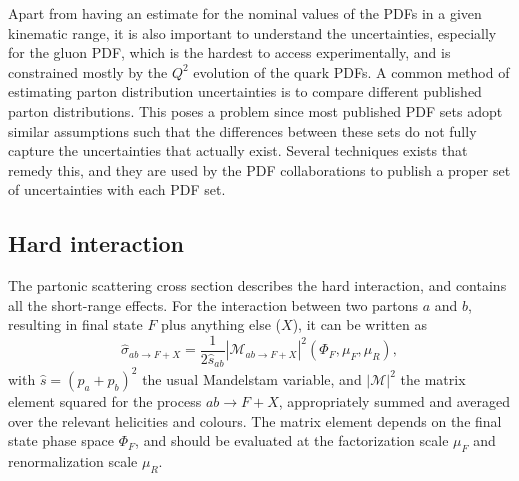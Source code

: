 Apart from having an estimate for the nominal values of the PDFs in a given kinematic range, it is
also important to understand the uncertainties, especially for the gluon PDF, which is the hardest
to access experimentally, and is constrained mostly by the $Q^2$ evolution of the quark PDFs. 
A common method of estimating parton distribution uncertainties is to compare different published
parton distributions. This poses a problem since most published PDF sets adopt similar
assumptions such that the differences between these sets do not fully capture the uncertainties that
actually exist. Several techniques exists that remedy this, and they are used by the PDF
collaborations to publish a proper set of uncertainties with each PDF set.  



\subsection{Hard interaction \label{sec:event_hard_interaction}}



The partonic scattering cross section describes the hard interaction, and contains all the
short-range effects. For the interaction between two partons $a$ and $b$, resulting in final state
$F$ plus anything else ($X$), it can be written as
\begin{equation}
  \hat{\sigma}_{ab\rightarrow F+X} = \frac{1}{2\hat{s}_{ab}} | \mathcal{M}_{ab\rightarrow
F+X}|^2(\Phi_F, \mu_F, \mu_R), 
\end{equation}
with $\hat{s} = (p_a + p_b)^2$ the usual Mandelstam variable, and 
$|\mathcal{M}|^2$ the matrix element squared for the process $a b \rightarrow F+X$, appropriately
summed and averaged over the relevant helicities and colours. 
The matrix element depends on the final state phase space $\Phi_F$, and should be evaluated at the
factorization scale $\mu_F$ and renormalization scale $\mu_R$.

